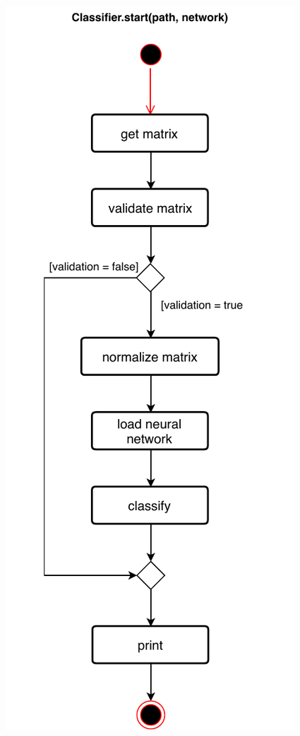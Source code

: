 \documentclass[parskip=full]{scrartcl}
\begin{document}
\begin{figure}[h]
\begin{center}
\includegraphics[height=\textheight]{ActivityDiagrams/PDF/classification}
\label{Activity Diagrams}
\end{center}
\end{figure}
\end{document}
